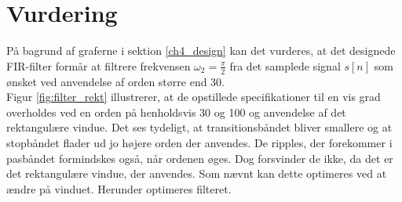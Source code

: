 \section{Vurdering}
På bagrund af graferne i sektion \ref{ch4_design} kan det vurderes, at det designede FIR-filter formår at filtrere frekvensen $\omega_2=\frac{\pi}{2}$ fra det samplede signal $s[n]$ som ønsket ved anvendelse af orden større end $30$. \\
Figur \ref{fig:filter_rekt} illustrerer, at de opstillede specifikationer til en vis grad overholdes ved en orden på henholdsvis 30 og 100 og anvendelse af det rektangulære vindue. Det ses tydeligt, at transitionsbåndet bliver smallere og at stopbåndet flader ud jo højere orden der anvendes. De ripples, der forekommer i pasbåndet formindskes også, når ordenen øges. Dog forsvinder de ikke, da det er det rektangulære vindue, der anvendes. Som nævnt kan dette optimeres ved at ændre på vinduet. Herunder optimeres filteret.


